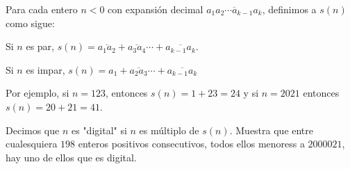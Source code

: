 Para cada entero $n\lt 0$ con expansión decimal $\overline{a_1a_2\cdots a_{k-1}a_k}$, definimos a $s(n)$ como sigue: 

Si $n$ es par, $s(n)=\overline{a_1a_2}+\overline{a_3a_4}\cdots+\overline{a_{k-1}a_k}$.

Si $n$ es impar, $s(n)=a_1+\overline{a_2a_3}\cdots+\overline{a_{k-1}a_k}$

Por ejemplo, si $n=123$, entonces $s(n)=1+23=24$ y si $n=2021$ entonces $s(n)=20+21=41$.

Decimos que $n$ es "digital" si $n$ es múltiplo de $s(n)$. Muestra que entre cualesquiera $198$ enteros positivos consecutivos, todos ellos menoress a $2000021$, hay uno de ellos que es digital.